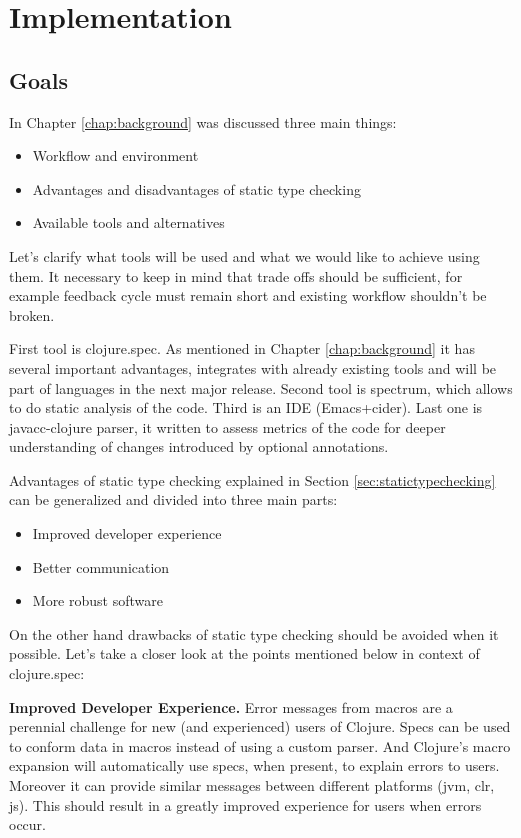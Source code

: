\chapter{Implementation}
\label{chap:implementation}

\section{Goals}

In Chapter \ref{chap:background} was discussed three main things:
\begin{itemize}
\item Workflow and environment
\item Advantages and disadvantages of static type checking
\item Available tools and alternatives
\end{itemize}

Let's clarify what tools will be used and what we would like to achieve using
them. It necessary to keep in mind that trade offs should be sufficient, for
example feedback cycle must remain short and existing workflow shouldn't be
broken.

First tool is clojure.spec. As mentioned in Chapter \ref{chap:background} it has
several important advantages, integrates with already existing tools and will be
part of languages in the next major release. Second tool is spectrum, which
allows to do static analysis of the code. Third is an IDE (Emacs+cider). Last
one is javacc-clojure parser, it written to assess metrics of the code for
deeper understanding of changes introduced by optional annotations.

Advantages of static type checking explained in Section
\ref{sec:statictypechecking} can be generalized and divided into three main
parts:

\begin{itemize}
\item Improved developer experience
\item Better communication
\item More robust software
\end{itemize}

On the other hand drawbacks of static type checking should be avoided when it
possible. Let's take a closer look at the points mentioned below in context of clojure.spec:

\textbf{Improved Developer Experience.} Error messages from macros are a
perennial challenge for new (and experienced) users of Clojure. Specs can be
used to conform data in macros instead of using a custom parser. And Clojure’s
macro expansion will automatically use specs, when present, to explain errors to
users. Moreover it can provide similar messages between different platforms
(jvm, clr, js). This should result in a greatly improved experience for users
when errors occur.

